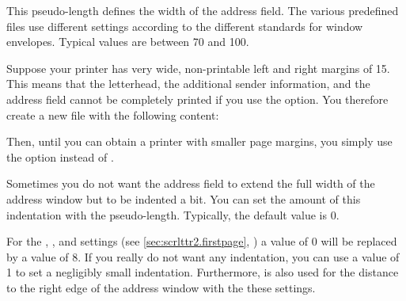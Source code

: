 \begin{Declaration}
\end{Declaration}
This pseudo-length defines the width of the address field. The various
predefined  files use different settings according to the different
standards for window envelopes. Typical values are between 70 and
100.
\begin{Example}
  Suppose your printer has very wide, non-printable left and right margins of 15.
  This means that the letterhead, the additional sender information, and the address field cannot
  be completely printed if you use the  option. You therefore
  create a new  file with the following content:
  Then, until you can obtain a printer with smaller page margins, you
  simply use the option  instead of .%
\end{Example}%
%
\EndIndexGroup


\begin{Declaration}
\end{Declaration}
Sometimes you do not want the address field to extend the full width of the
address window but to be indented a bit. You can set the amount of this
indentation with the  pseudo-length. Typically, the
default value is 0.

For the
,
%
, and
%
 settings (see
\autoref{sec:scrlttr2.firstpage}, ) a
value of 0 will be replaced by a value of 8. If you really
do not want any indentation, you can use a value of 1 to set a
negligibly small indentation. Furthermore,  is also used
for the distance to the right edge of the address window with the these
 settings.%
\EndIndexGroup


